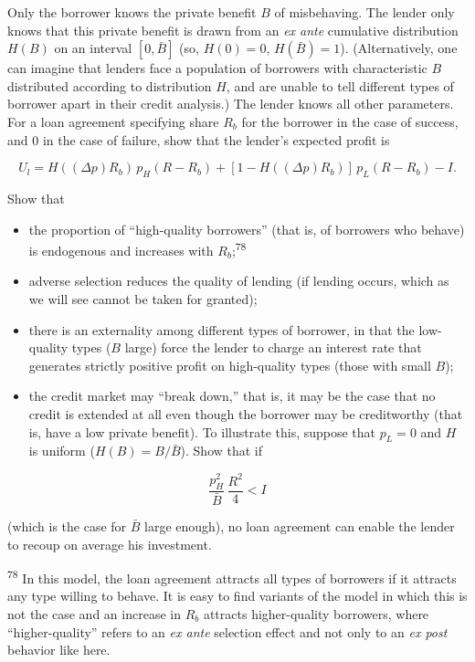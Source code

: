 \documentclass[11pt,a4paper]{article}
\providecommand{\tightlist}{\setlength{\itemsep}{0pt}\setlength{\parskip}{0pt}}
\begin{document}
Only the borrower knows the private benefit \(B\) of misbehaving. The lender only knows that this
private benefit is drawn from an \emph{ex ante} cumulative distribution \(H(B)\) on an interval
\([0, \bar B]\) (so, \(H(0) = 0\), \(H(\bar B) = 1\)). (Alternatively, one can imagine that lenders
face a population of borrowers with characteristic \(B\) distributed according to distribution
\(H\), and are unable to tell different types of borrower apart in their credit analysis.) The
lender knows all other parameters. For a loan agreement specifying share \(R_b\) for the borrower in
the case of success, and 0 in the case of failure, show that the lender's expected profit is

\[U_l = H((\Delta p)R_b)\,p_H(R - R_b) + [1 - H((\Delta p)R_b)]\,p_L(R - R_b) - I.\]

Show that

\begin{itemize}
\tightlist
\item
  the proportion of ``high-quality borrowers'' (that is, of borrowers who behave) is endogenous and
  increases with \(R_b\);\textsuperscript{78}
\item
  adverse selection reduces the quality of lending (if lending occurs, which as we will see cannot
  be taken for granted);
\item
  there is an externality among different types of borrower, in that the low-quality types (\(B\)
  large) force the lender to charge an interest rate that generates strictly positive profit on
  high-quality types (those with small \(B\));
\item
  the credit market may ``break down,'' that is, it may be the case that no credit is extended at
  all even though the borrower may be creditworthy (that is, have a low private benefit). To
  illustrate this, suppose that \(p_L = 0\) and \(H\) is uniform (\(H(B) = B/\bar B\)). Show that if
\end{itemize}

\[\frac{p_H^2}{\bar B}\,\frac{R^2}{4} < I\]

(which is the case for \(\bar B\) large enough), no loan agreement can enable the lender to recoup
on average his investment.

\textsuperscript{78} In this model, the loan agreement attracts all types of borrowers if it
attracts any type willing to behave. It is easy to find variants of the model in which this is not
the case and an increase in \(R_b\) attracts higher-quality borrowers, where ``higher-quality''
refers to an \emph{ex ante} selection effect and not only to an \emph{ex post} behavior like here.
\end{document}
